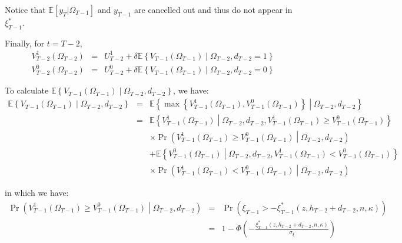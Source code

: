 \noindent Notice that $\mathbb{E} [y_T | \Omega_{T-1}]$ and $y_{T-1}$ are cancelled out and thus do not appear in $\xi_{T-1}^*$.

\noindent Finally, for $t = T-2$,
\begin{eqnarray*}
V^{1}_{T-2}\left(\Omega_{T-2}\right) &=& U^{1}_{T-2} + 
\delta \mathbb{E} \left\{ V_{T-1}\left(\Omega_{T-1}\right) \middle| \Omega_{T-2}, d_{T-2}=1\right\} \\
V^{0}_{T-2}\left(\Omega_{T-2}\right) &=& U^{0}_{T-2} + 
\delta \mathbb{E} \left\{ V_{T-1}\left(\Omega_{T-1}\right) \middle| \Omega_{T-2}, d_{T-2}=0\right\}
\end{eqnarray*}

\noindent To calculate $\mathbb{E} \left\{ V_{T-1}\left(\Omega_{T-1}\right) \middle| \Omega_{T-2}, d_{T-2}\right\}$, we have:
\begin{eqnarray*}
\mathbb{E} \left\{ V_{T-1}\left(\Omega_{T-1}\right) \middle| \Omega_{T-2}, d_{T-2}\right\} &=& \mathbb{E} \left\{ \max\left\{ V^{1}_{T-1}\left(\Omega_{T-1}\right), V^{0}_{T-1}\left(\Omega_{T-1}\right) \right\} \middle| \Omega_{T-2}, d_{T-2} \right\} \\
&=& \mathbb{E} \left\{ V^{1}_{T-1}\left(\Omega_{T-1}\right) \middle| \Omega_{T-2}, d_{T-2}, V^{1}_{T-1}\left(\Omega_{T-1}\right) \geq V^{0}_{T-1}\left(\Omega_{T-1}\right) \right\} \\
& & \times \Pr\left(V^1_{T-1}\left(\Omega_{T-1}\right) \geq V^0_{T-1}\left(\Omega_{T-1}\right) \middle| \Omega_{T-2}, d_{T-2} \right)\\
& & + \mathbb{E} \left\{ V^{0}_{T-1}\left(\Omega_{T-1}\right) \middle| \Omega_{T-2}, d_{T-2}, V^{1}_{T-1}\left(\Omega_{T-1}\right) < V^{0}_{T-1}\left(\Omega_{T-1}\right) \right\} \\
& & \times \Pr\left(V^1_{T-1}\left(\Omega_{T-1}\right) < V^0_{T-1}\left(\Omega_{T-1}\right) \middle| \Omega_{T-2}, d_{T-2} \right)
\end{eqnarray*}

\noindent in which we have:
\begin{eqnarray*}
\Pr\left(V^1_{T-1}\left(\Omega_{T-1}\right) \geq V^0_{T-1}\left(\Omega_{T-1}\right) \middle| \Omega_{T-2}, d_{T-2} \right) &=& \Pr \left(\xi_{T-1} > -\xi^*_{T-1}\left(z, h_{T-2}+d_{T-2}, n, \kappa \right) \right)\\
&=& 1 - \Phi \left(-\frac{\xi^*_{T-1}\left(z, h_{T-2}+d_{T-2}, n, \kappa \right)}{\sigma_\xi}\right) 
\end{eqnarray*}

